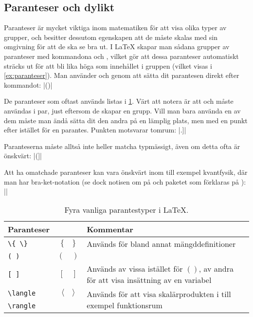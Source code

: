 \documentclass[10pt,../../a4.tex]{subfiles}
\begin{document}
\subsection{Paranteser och dylikt}
Paranteser är mycket viktiga inom matematiken för att visa olika typer av
grupper, och besitter dessutom egenskapen att de måste skalas med sin
omgivning för att de ska se bra ut. I \LaTeX{} skapar man sådana
grupper av paranteser med kommandona  och , vilket
gör att dessa paranteser automatiskt sträcks ut för att bli lika höga som
innehållet i gruppen (vilket visas i \cref{ex:paranteser}). Man 
använder  och  genom att
sätta dit parantesen direkt efter kommandot:
\latex|\left(\right)|

De paranteser som oftast används listas i \cref{tab:paranteser}.
Värt att notera är att  och  måste användas i par,
just eftersom de skapar en grupp. Vill man bara använda en av dem måste
man ändå sätta dit den andra på en lämplig plats, men med en punkt efter
istället för en parantes. Punkten motsvarar tomrum:
\latex|\left.\right]|

Paranteserna måste alltså inte heller matcha typmässigt, även om detta
ofta är önskvärt:
\latex|\left(\right]|

Att ha omatchade paranteser kan vara önskvärt inom till exempel
kvantfysik, där man har bra-ket-notation (se dock notisen om 
på  och paketet  som förklaras 
på ):
\latex|\left\langle\psi\right\vert|

\begin{table}[t]
	\centering 
	\caption{Fyra vanliga parantestyper i \LaTeX.}
	\label{tab:paranteser}
	\begin{tabular}{lcp{}}
		\toprule 
		Paranteser & & Kommentar \\
		\midrule 
		\verb|\{ \}| & \(\{\quad\}\) & Används för bland annat 
		mängddefinitioner \\
		\texttt{( )} & \( (\quad) \) & \\
		\texttt{[ ]} & \( [\quad] \) & Används av vissa istället för 
		\(()\), av andra för att visa insättning av en variabel\\
		\verb|\langle| & \(\langle\quad\rangle\) &
		\multirow{2}{0.5\textwidth}{Används för att visa skalärprodukten i
		till exempel funktionsrum}\\
		\verb|\rangle| & & \\
		\bottomrule 
	\end{tabular}
\end{table}
\end{document}
